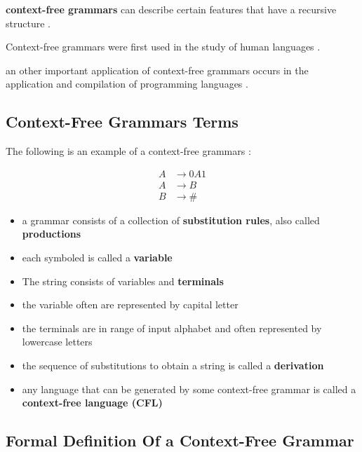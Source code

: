 \documentclass[12pt]{article}
\begin{document}
\textbf{context-free grammars} can describe certain features that have a recursive structure .

\noindent
Context-free grammars were first used in the study of human languages .

\noindent
an other important application of context-free grammars occurs in the application and compilation of programming languages .


\subsection{Context-Free Grammars Terms}

The following is an example of a context-free grammars  :

\begin{align*}
A &\to 0A1 \\
A &\to B \\
B &\to \# 
\end{align*}


\begin{itemize}
	\item a grammar consists of a collection of \textbf{substitution rules}, also called \textbf{productions}
	\item each symboled is called a \textbf{variable}
	\item The string consists of variables and \textbf{terminals}
	\item the variable often are represented by capital letter
	\item the terminals are in range of input alphabet and often represented by lowercase letters
	\item the sequence of substitutions to obtain a string is called a \textbf{derivation}
\end{itemize}


\begin{tcolorbox}
\begin{itemize}
	\item any language that can be generated by some context-free grammar is called a \textbf{context-free language (CFL)}
\end{itemize}
\end{tcolorbox}



\subsection{Formal Definition Of a Context-Free Grammar}
\end{document}
